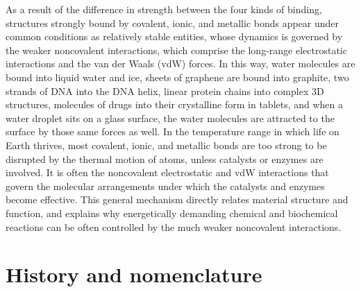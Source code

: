 As a result of the difference in strength between the four kinds of binding, structures strongly bound by covalent, ionic, and metallic bonds appear under common conditions as relatively stable entities, whose dynamics is governed by the weaker noncovalent interactions, which comprise the long-range electrostatic interactions and the van der Waals (vdW) forces.
In this way, water molecules are bound into liquid water and ice, sheets of graphene are bound into graphite, two strands of DNA into the DNA helix, linear protein chains into complex 3D structures, molecules of drugs into their crystalline form in tablets, and when a water droplet sits on a glass surface, the water molecules are attracted to the surface by those same forces as well.
In the temperature range in which life on Earth thrives, most covalent, ionic, and metallic bonds are too strong to be disrupted by the thermal motion of atoms, unless catalysts or enzymes are involved.
It is often the noncovalent electrostatic and vdW interactions that govern the molecular arrangements under which the catalysts and enzymes become effective.
This general mechanism directly relates material structure and function, and explains why energetically demanding chemical and biochemical reactions can be often controlled by the much weaker noncovalent interactions.

\section{History and nomenclature}

